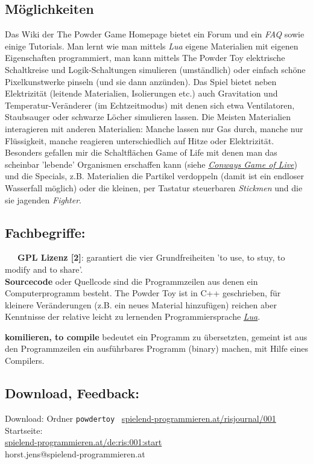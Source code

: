 \subsection*{Möglichkeiten}

Das Wiki der The Powder Game Homepage bietet ein Forum und ein \textit{FAQ} sowie einige Tutorials. Man lernt wie man mittels \textit{Lua} eigene Materialien mit eigenen Eigenschaften programmiert, man kann mittels The Powder Toy elektrische Schaltkreise und Logik-Schaltungen simulieren (umständlich) oder einfach schöne Pixelkunstwerke pinseln (und sie dann anzünden). Das Spiel bietet neben Elektrizität (leitende Materialien, Isolierungen etc.) auch Gravitation und Temperatur-Veränderer (im Echtzeitmodus) mit denen sich etwa Ventilatoren, Staubsauger oder schwarze Löcher simulieren lassen. Die Meisten Materialien interagieren mit anderen Materialien: Manche lassen nur Gas durch, manche nur Flüssigkeit, manche reagieren unterschiedlich auf Hitze oder Elektrizität. Besonders gefallen mir die Schaltflächen Game of Life mit denen man das scheinbar 'lebende' Organismen erschaffen kann (siehe \href{https://de.wikipedia.org/wiki/Conways_Spiel_des_Lebens}{\textit{Conways Game of Live}}) und die Specials, z.B. Materialien die Partikel verdoppeln (damit ist ein endloser Wasserfall möglich) oder die kleinen, per Tastatur steuerbaren \textit{Stickmen} und die sie jagenden \textit{Fighter}. 

\subsection*{Fachbegriffe:}

~~~\textbf{GPL Lizenz [2]}: garantiert die vier Grundfreiheiten 'to use, to stuy, to modify and to share'. \\ 

\textbf{Sourcecode} oder Quellcode sind die Programmzeilen aus denen ein Computerprogramm besteht. The Powder Toy ist in C++ geschrieben, für kleinere Veränderungen (z.B. ein neues Material hinzufügen) reichen aber Kenntnisse der relative leicht zu lernenden Programmiersprache \href{https://de.wikipedia.org/wiki/Lua}{\textit{Lua}}.

\textbf{komilieren, to compile} bedeutet ein Programm zu übersetzten, gemeint ist aus den Programmzeilen ein ausführbares Programm (binary) machen, mit Hilfe eines Compilers. 

\subsection*{Download, Feedback:}
\footnotesize{
Download: Ordner \texttt{powdertoy} \Mundus\ \href{http://spielend-programmieren.at/risjournal/001}{spielend-programmieren.at/risjournal/001}\\
Startseite:\\
\href{http://spielend-programmieren.at/de:ris:001:start}{spielend-programmieren.at/de:ris:001:start}\\ 
\Letter\:  horst.jens@spielend-programmieren.at \\}
\normalsize{}

